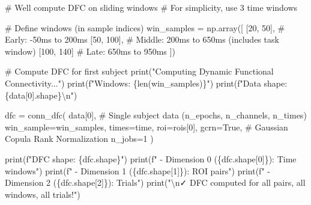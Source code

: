 \documentclass[
  11pt,
  letterpaper,
  oneside,
  openany]{book}
\newenvironment{Shaded}{\begin{snugshade}}{\end{snugshade}}
\newcommand{\BuiltInTok}[1]{\textcolor[rgb]{0.00,0.23,0.31}{#1}}
\newcommand{\CharTok}[1]{\textcolor[rgb]{0.13,0.47,0.30}{#1}}
\newcommand{\CommentTok}[1]{\textcolor[rgb]{0.37,0.37,0.37}{#1}}
\newcommand{\DecValTok}[1]{\textcolor[rgb]{0.68,0.00,0.00}{#1}}
\newcommand{\NormalTok}[1]{\textcolor[rgb]{0.00,0.23,0.31}{#1}}
\newcommand{\OperatorTok}[1]{\textcolor[rgb]{0.37,0.37,0.37}{#1}}
\newcommand{\SpecialCharTok}[1]{\textcolor[rgb]{0.37,0.37,0.37}{#1}}
\newcommand{\SpecialStringTok}[1]{\textcolor[rgb]{0.13,0.47,0.30}{#1}}
\newcommand{\StringTok}[1]{\textcolor[rgb]{0.13,0.47,0.30}{#1}}
\newcommand{\VariableTok}[1]{\textcolor[rgb]{0.07,0.07,0.07}{#1}}
\begin{document}
\begin{Shaded}
\begin{Highlighting}[]
\CommentTok{\# We\textquotesingle{}ll compute DFC on sliding windows}
\CommentTok{\# For simplicity, use 3 time windows}

\CommentTok{\# Define windows (in sample indices)}
\NormalTok{win\_samples }\OperatorTok{=}\NormalTok{ np.array([}
\NormalTok{    [}\DecValTok{20}\NormalTok{, }\DecValTok{50}\NormalTok{],   }\CommentTok{\# Early: {-}50ms to 200ms}
\NormalTok{    [}\DecValTok{50}\NormalTok{, }\DecValTok{100}\NormalTok{],  }\CommentTok{\# Middle: 200ms to 650ms (includes task window)}
\NormalTok{    [}\DecValTok{100}\NormalTok{, }\DecValTok{140}\NormalTok{]  }\CommentTok{\# Late: 650ms to 950ms}
\NormalTok{])}

\CommentTok{\# Compute DFC for first subject}
\BuiltInTok{print}\NormalTok{(}\StringTok{"Computing Dynamic Functional Connectivity..."}\NormalTok{)}
\BuiltInTok{print}\NormalTok{(}\SpecialStringTok{f"Windows: }\SpecialCharTok{\{}\BuiltInTok{len}\NormalTok{(win\_samples)}\SpecialCharTok{\}}\SpecialStringTok{"}\NormalTok{)}
\BuiltInTok{print}\NormalTok{(}\SpecialStringTok{f"Data shape: }\SpecialCharTok{\{}\NormalTok{data[}\DecValTok{0}\NormalTok{]}\SpecialCharTok{.}\NormalTok{shape}\SpecialCharTok{\}}\CharTok{\textbackslash{}n}\SpecialStringTok{"}\NormalTok{)}

\NormalTok{dfc }\OperatorTok{=}\NormalTok{ conn\_dfc(}
\NormalTok{    data[}\DecValTok{0}\NormalTok{],              }\CommentTok{\# Single subject data (n\_epochs, n\_channels, n\_times)}
\NormalTok{    win\_sample}\OperatorTok{=}\NormalTok{win\_samples,}
\NormalTok{    times}\OperatorTok{=}\NormalTok{time,}
\NormalTok{    roi}\OperatorTok{=}\NormalTok{rois[}\DecValTok{0}\NormalTok{],}
\NormalTok{    gcrn}\OperatorTok{=}\VariableTok{True}\NormalTok{,            }\CommentTok{\# Gaussian Copula Rank Normalization}
\NormalTok{    n\_jobs}\OperatorTok{=}\DecValTok{1}
\NormalTok{)}

\BuiltInTok{print}\NormalTok{(}\SpecialStringTok{f"DFC shape: }\SpecialCharTok{\{}\NormalTok{dfc}\SpecialCharTok{.}\NormalTok{shape}\SpecialCharTok{\}}\SpecialStringTok{"}\NormalTok{)}
\BuiltInTok{print}\NormalTok{(}\SpecialStringTok{f"  {-} Dimension 0 (}\SpecialCharTok{\{}\NormalTok{dfc}\SpecialCharTok{.}\NormalTok{shape[}\DecValTok{0}\NormalTok{]}\SpecialCharTok{\}}\SpecialStringTok{): Time windows"}\NormalTok{)}
\BuiltInTok{print}\NormalTok{(}\SpecialStringTok{f"  {-} Dimension 1 (}\SpecialCharTok{\{}\NormalTok{dfc}\SpecialCharTok{.}\NormalTok{shape[}\DecValTok{1}\NormalTok{]}\SpecialCharTok{\}}\SpecialStringTok{): ROI pairs"}\NormalTok{)}
\BuiltInTok{print}\NormalTok{(}\SpecialStringTok{f"  {-} Dimension 2 (}\SpecialCharTok{\{}\NormalTok{dfc}\SpecialCharTok{.}\NormalTok{shape[}\DecValTok{2}\NormalTok{]}\SpecialCharTok{\}}\SpecialStringTok{): Trials"}\NormalTok{)}
\BuiltInTok{print}\NormalTok{(}\StringTok{"}\CharTok{\textbackslash{}n}\StringTok{✓ DFC computed for all pairs, all windows, all trials!"}\NormalTok{)}
\end{Highlighting}
\end{Shaded}
\end{document}

